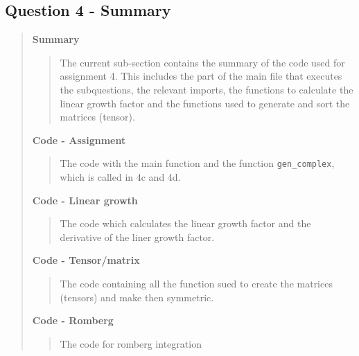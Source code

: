 
\subsection*{\textbf{Question 4 - Summary}}
\begin{quote}

\textbf{Summary}
\begin{quote}
The current sub-section contains the summary of the code used for assignment 4. This includes the part of the main file that executes the subquestions, the relevant imports, the functions to calculate the linear growth factor and the functions used to generate and sort the matrices (tensor).

\end{quote}


\textbf{Code - Assignment}

\begin{quote}
The code with the main function and the function \texttt{gen\_complex}, which is called in 4c and 4d. 
\label{CODE:MAIN4}

\end{quote}

\textbf{Code - Linear growth} \\
\begin{quote}
The code which calculates the linear growth factor and the derivative of the liner growth factor.
\label{CODE:h4}

\end{quote}

\textbf{Code - Tensor/matrix}
\begin{quote}
The code containing all the function sued to create the matrices (tensors) and make then symmetric.  

\label{CODE:misc}
\end{quote}

\textbf{Code - Romberg}
\begin{quote}
The code for romberg integration

\label{CODE:misc}
\end{quote}
\end{quote}

\newpage

%

%


%
\newpage












